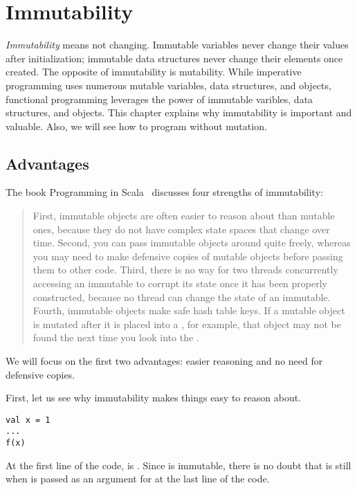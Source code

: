 \setchapterpreamble[u]{\margintoc}
\chapter{Immutability}

\textit{Immutability} means not changing.
Immutable variables never change their values
after initialization; immutable data structures never change their elements
once created. The opposite of immutability is mutability. While imperative
programming uses numerous mutable variables, data structures, and objects,
functional programming leverages the power of immutable varibles, data
structures, and objects. This chapter explains why immutability is important and
valuable. Also, we will see how to program without mutation.

\section{Advantages}

The book Programming in Scala~\cite{programming-in-scala}
discusses four strengths of immutability:

\begin{quote}
First, immutable objects are often easier to reason about than mutable ones,
because they do not have complex state spaces that change over time. Second, you
can pass immutable objects around quite freely, whereas you may need to make
defensive copies of mutable objects before passing them to other code. Third,
there is no way for two threads concurrently accessing an immutable to corrupt
its state once it has been properly constructed, because no thread can change the
state of an immutable. Fourth, immutable objects make safe hash table keys. If a
mutable object is mutated after it is placed into a , for example,
that object may not be found the next time you look into the .
\end{quote}

We will focus on the first two advantages:
easier reasoning and no need for defensive copies.

First, let us see why immutability makes things easy to reason about.

\begin{verbatim}
val x = 1
...
f(x)
\end{verbatim}

At the first line of the code,  is . Since  is immutable,
there is no doubt that  is still  when  is passed as an
argument for  at the last line of the code.

